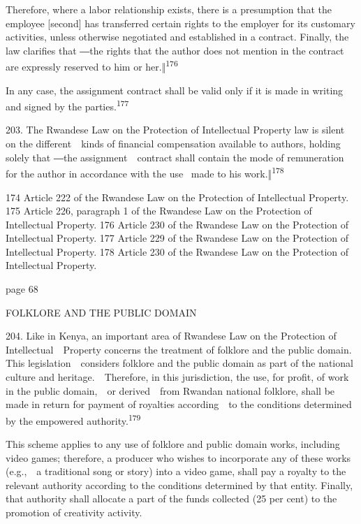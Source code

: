 \documentclass[
]{article}
\begin{document}
{Therefore, where a labor relationship exists, there is a presumption
that the employee {[}second{]} has transferred certain rights to the
employer for its customary activities, unless otherwise negotiated and
established in a contract. }{Finally, the law clarifies that ―}{the
rights that the author does not mention in the contract are expressly
reserved to him or }{her.‖}\textsuperscript{{176}}

{In any case, the assignment contract shall be valid only if it is made
in writing and signed by the parties.}\textsuperscript{{177}}

{203. }{The Rwandese }{Law on the Protection of Intellectual Property
}{law is silent on the different~~kinds of financial compensation
available to authors, holding solely tha}{t ―}{the assignment~~contract
shall contain the mode of remuneration for the author in accordance with
the use }{~made to his work.‖}\textsuperscript{{178}}

{174 }{Article 222 of the Rwandese }{Law on the Protection of
Intellectual Property}{. }{175 }{Article 226, paragraph 1 of the
Rwandese }{Law on the Protection of Intellectual Property}{. }{176
}{Article 230 of the Rwandese }{Law on the Protection of Intellectual
Property}{. }{177 }{Article 229 of the Rwandese }{Law on the Protection
of Intellectual Property}{. }{178 }{Article 230 of the Rwandese }{Law on
the Protection of Intellectual Property}{.}

{page 68}

{FOLKLORE AND THE PUBLIC DOMAIN}

{204. }{Like in Kenya, an important area of Rwandese }{Law on the
Protection of Intellectual~~Property }{concerns the treatment of
folklore and the public domain. This legislation~~considers folklore and
the public domain as part of the national culture and
heritage.~~Therefore, in this jurisdiction, the use, for profit, of work
in the public domain,~~or derived~~from Rwandan national folklore, shall
be made in return for payment of royalties according~~to the conditions
determined by the empowered authority.}\textsuperscript{{179}}

{This scheme applies to any use of folklore and public domain works,
including video games; therefore, a producer who wishes to incorporate
any of these works (e.g.,~~a traditional song or story) into a video
game, shall pay a royalty to the relevant authority according to the
conditions determined by that entity. Finally, that authority shall
allocate a part of the funds collected (25 per cent) to the promotion of
creativity activity.}
\end{document}

